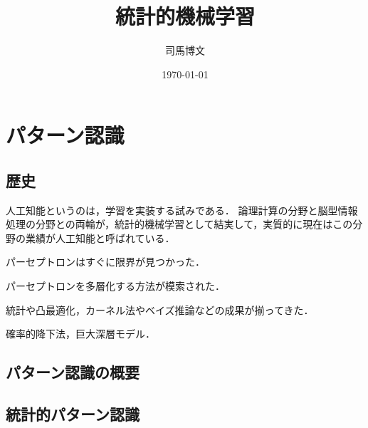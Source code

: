 \documentclass[uplatex,dvipdfmx]{jsreport}
\title{統計的機械学習}
\author{司馬博文}
\date{\today}
\begin{document}
\tableofcontents

\chapter{パターン認識}

\section{歴史}

\begin{tcolorbox}[colframe=ForestGreen, colback=ForestGreen!10!white,breakable,colbacktitle=ForestGreen!40!white,coltitle=black,fonttitle=\bfseries\sffamily,
title=]
    人工知能というのは，学習を実装する試みである．
    論理計算の分野と脳型情報処理の分野との両輪が，統計的機械学習として結実して，実質的に現在はこの分野の業績が人工知能と呼ばれている．
\end{tcolorbox}

\begin{history}
    パーセプトロンはすぐに限界が見つかった．
\end{history}

\begin{history}
    パーセプトロンを多層化する方法が模索された．
\end{history}

\begin{history}[統計的機械学習 (2000s)]
    統計や凸最適化，カーネル法やベイズ推論などの成果が揃ってきた．
\end{history}

\begin{history}[深層学習 (2010s)]
    確率的降下法，巨大深層モデル．
\end{history}

\section{パターン認識の概要}

\section{統計的パターン認識}
\end{document}
